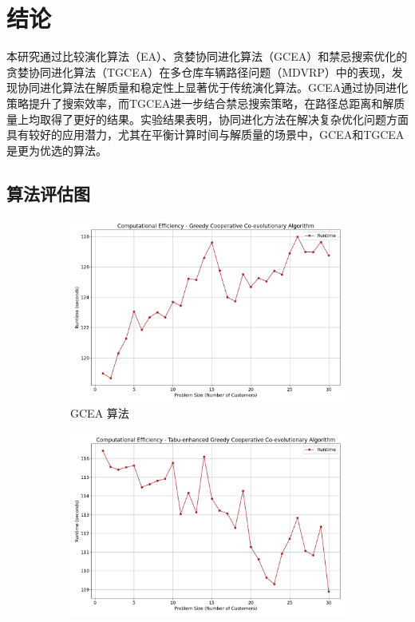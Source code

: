 \documentclass[12pt,a4paper,oneside]{ctexart}
\begin{document}
\section{结论}

本研究通过比较演化算法（EA）、贪婪协同进化算法（GCEA）和禁忌搜索优化的贪婪协同进化算法（TGCEA）在多仓库车辆路径问题（MDVRP）中的表现，发现协同进化算法在解质量和稳定性上显著优于传统演化算法。GCEA通过协同进化策略提升了搜索效率，而TGCEA进一步结合禁忌搜索策略，在路径总距离和解质量上均取得了更好的结果。实验结果表明，协同进化方法在解决复杂优化问题方面具有较好的应用潜力，尤其在平衡计算时间与解质量的场景中，GCEA和TGCEA是更为优选的算法。
	
\newpage


	
	\newpage
	\begin{appendices}
	\section{算法评估图}
	\begin{figure}[h!]
		\centering
		\begin{subfigure}{0.32\textwidth}
			\includegraphics[width=\textwidth]{fig/22.png}
			\caption{GCEA 算法}
		\end{subfigure}
		\begin{subfigure}{0.32\textwidth}
			\includegraphics[width=\textwidth]{fig/27.png}

\end{subfigure}
\end{figure}
\end{appendices}
\end{document}
